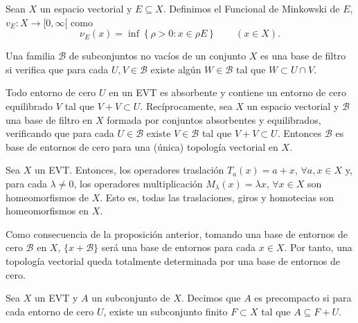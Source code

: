 \begin{definicion}
Sean $X$ un espacio vectorial y $E\subseteq X$. Definimos el Funcional de Minkowski de $E$, $v_{E}:X\rightarrow[0,\infty[$ como
\begin{equation}
\nu_{E}(x) =\inf \left\{ \rho > 0 : x\in\rho E\right\} \qquad (x\in X).
\end{equation}
\end{definicion}

\begin{definicion}
Una familia $\mathcal{B}$ de subconjuntos no vacíos de un conjunto $X$ es una base de filtro si verifica que para cada $U,V\in \mathcal{B}$ existe algún $W\in\mathcal{B}$ tal que $W\subset U\cap V$. 
\end{definicion}

\begin{teorema}
Todo entorno de cero $U$ en un EVT es absorbente y contiene un entorno de cero equilibrado $V$ tal que $V + V \subset U$. Recíprocamente, sea $X$ un espacio vectorial y $\mathcal{B}$ una base de filtro en $X$ formada por conjuntos absorbentes y equilibrados, verificando que para cada $U\in\mathcal{B}$ existe $V\in\mathcal{B}$ tal que $V+V\subset U$. Entonces $\mathcal{B}$ es base de entornos de cero para una (única) topología vectorial en $X$. 
\end{teorema}

\begin{proposicion}
Sea $X$ un EVT. Entonces, los operadores traslación $T_{a}(x) = a + x$, $\forall a,x\in X$ y, para cada $\lambda \neq 0$, los operadores multiplicación $M_{\lambda}(x)=\lambda x$, $\forall x\in X$ son homeomorfismos de $X$. Esto es, todas las traslaciones, giros y homotecias son homeomorfismos en $X$.
\end{proposicion}

Como consecuencia de la proposición anterior, tomando una base de entornos de cero $\mathcal{B}$ en $X$, $\{x + \mathcal{B}\}$ será una base de entornos para cada $x\in X$. Por tanto, una topología vectorial queda totalmente determinada por una base de entornos de cero. 

\begin{definicion}
    Sea $X$ un EVT y $A$ un subconjunto de $X$. Decimos que $A$ es precompacto si para cada entorno de cero $U$, existe un subconjunto finito $F\subset X$ tal que $A\subseteq F+U$.
\end{definicion}

